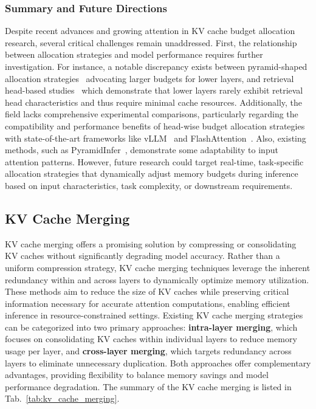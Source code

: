 \subsubsection{Summary and Future Directions} 
Despite recent advances and growing attention in KV cache budget allocation research, 
several critical challenges remain unaddressed. First, the relationship between allocation strategies and 
model performance requires further investigation. 
For instance, a notable discrepancy exists between pyramid-shaped allocation 
strategies~\cite{DBLP:journals/corr/abs-2406-02069, DBLP:conf/acl/YangHGHZ024} 
advocating larger budgets for lower layers, and retrieval head-based 
studies~\cite{DBLP:journals/corr/abs-2407-15891,DBLP:journals/corr/abs-2410-19258} 
which demonstrate that lower layers rarely exhibit retrieval head characteristics and 
thus require minimal cache resources. 
Additionally, the field lacks comprehensive experimental comparisons, 
particularly regarding the compatibility and performance benefits of head-wise budget allocation strategies
with state-of-the-art frameworks like vLLM~\cite{DBLP:conf/sosp/KwonLZ0ZY0ZS23} and FlashAttention~\cite{DBLP:conf/nips/DaoFERR22}.
Also,
existing methods, such as PyramidInfer~\cite{DBLP:conf/acl/YangHGHZ024}, demonstrate some adaptability to input attention patterns. However, future research could target real-time, task-specific allocation strategies that dynamically adjust memory budgets during inference based on input characteristics, task complexity, or downstream requirements.





\subsection{KV Cache Merging}\label{ssec:kv_merge}
KV cache merging offers a promising solution by compressing or consolidating KV caches without significantly degrading model accuracy. Rather than a uniform compression strategy, KV cache merging techniques leverage the inherent redundancy within and across layers to dynamically optimize memory utilization. These methods aim to reduce the size of KV caches while preserving critical information necessary for accurate attention computations, enabling efficient inference in resource-constrained settings.
Existing KV cache merging strategies can be categorized into two primary approaches: \textbf{intra-layer merging}, which focuses on consolidating KV caches within individual layers to reduce memory usage per layer, and \textbf{cross-layer merging}, which targets redundancy across layers to eliminate unnecessary duplication. Both approaches offer complementary advantages, providing flexibility to balance memory savings and model performance degradation.
The summary of the KV cache merging is listed in Tab.~\ref{tab:kv_cache_merging}.



